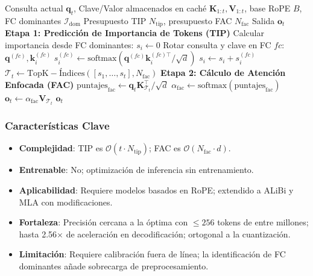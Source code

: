 \documentclass[11pt,a4paper]{article}
\begin{document}
\begin{algorithm}[H]
\caption{FASA: Atención Dispersa Consciente de la Frecuencia (en Tiempo de Inferencia)}
\begin{algorithmic}[1]
\Require Consulta actual $\mathbf{q}_t$, Clave/Valor almacenados en caché $\mathbf{K}_{1:t}, \mathbf{V}_{1:t}$, base RoPE $B$, FC dominantes $\mathcal{I}_{\text{dom}}$
\Require Presupuesto TIP $N_{\text{tip}}$, presupuesto FAC $N_{\text{fac}}$
\Ensure Salida $\mathbf{o}_t$
\State \textbf{Etapa 1: Predicción de Importancia de Tokens (TIP)}
        \State Calcular importancia desde FC dominantes: $s_i \gets 0$
            \State Rotar consulta y clave en FC $fc$: $\mathbf{q}^{(fc)}, \mathbf{k}_i^{(fc)}$
            \State $s_i^{(fc)} \gets \text{softmax}(\mathbf{q}^{(fc)} \mathbf{k}_i^{(fc)\top} / \sqrt{d}) $
            \State $s_i \gets s_i + s_i^{(fc)}$
        \EndFor
    \EndFor
    \State $\mathcal{T}_t \gets \mathrm{TopK-Índices}([s_1, \ldots, s_t], N_{\text{fac}})$ 
\EndFor
\State \textbf{Etapa 2: Cálculo de Atención Enfocada (FAC)}
\State $\text{puntajes}_{\text{fac}} \gets \mathbf{q}_t \mathbf{K}_{\mathcal{T}_t}^\top / \sqrt{d}$ 
\State $\alpha_{\text{fac}} \gets \text{softmax}(\text{puntajes}_{\text{fac}})$ 
\State $\mathbf{o}_t \gets \alpha_{\text{fac}} \mathbf{V}_{\mathcal{T}_t}$ 
\Return $\mathbf{o}_t$
\end{algorithmic}
\end{algorithm}

\subsubsection{Características Clave}

\begin{itemize}[leftmargin=*]
    \item \textbf{Complejidad}: TIP es $\mathcal{O}(t \cdot N_{\text{tip}})$; FAC es $\mathcal{O}(N_{\text{fac}} \cdot d)$.
    \item \textbf{Entrenable}: No; optimización de inferencia sin entrenamiento.
    \item \textbf{Aplicabilidad}: Requiere modelos basados en RoPE; extendido a ALiBi y MLA con modificaciones.
    \item \textbf{Fortaleza}: Precisión cercana a la óptima con $\leq 256$ tokens de entre millones; hasta 2.56$\times$ de aceleración en decodificación; ortogonal a la cuantización.
    \item \textbf{Limitación}: Requiere calibración fuera de línea; la identificación de FC dominantes añade sobrecarga de preprocesamiento.
\end{itemize}
\end{document}
